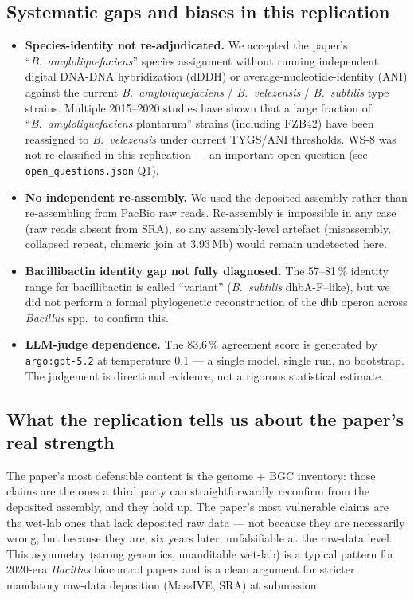 \documentclass[11pt]{article}
\begin{document}
\subsection{Systematic gaps and biases in this replication}
\begin{itemize}
\item \textbf{Species-identity not re-adjudicated.} We accepted the paper's ``\textit{B.\ amyloliquefaciens}'' species assignment without running independent digital DNA-DNA hybridization (dDDH) or average-nucleotide-identity (ANI) against the current \textit{B.\ amyloliquefaciens} / \textit{B.\ velezensis} / \textit{B.\ subtilis} type strains. Multiple 2015--2020 studies have shown that a large fraction of ``\textit{B.\ amyloliquefaciens} plantarum'' strains (including FZB42) have been reassigned to \textit{B.\ velezensis} under current TYGS/ANI thresholds. WS-8 was not re-classified in this replication --- an important open question (see \texttt{open\_questions.json} Q1).
\item \textbf{No independent re-assembly.} We used the deposited assembly rather than re-assembling from PacBio raw reads. Re-assembly is impossible in any case (raw reads absent from SRA), so any assembly-level artefact (misassembly, collapsed repeat, chimeric join at 3.93\,Mb) would remain undetected here.
\item \textbf{Bacillibactin identity gap not fully diagnosed.} The 57--81\,\% identity range for bacillibactin is called ``variant'' (\textit{B.\ subtilis} dhbA-F--like), but we did not perform a formal phylogenetic reconstruction of the \texttt{dhb} operon across \textit{Bacillus} spp.\ to confirm this.
\item \textbf{LLM-judge dependence.} The 83.6\,\% agreement score is generated by \texttt{argo:gpt-5.2} at temperature 0.1 --- a single model, single run, no bootstrap. The judgement is directional evidence, not a rigorous statistical estimate.
\end{itemize}

\subsection{What the replication tells us about the paper's real strength}
The paper's most defensible content is the genome + BGC inventory: those claims are the ones a third party can straightforwardly reconfirm from the deposited assembly, and they hold up. The paper's most vulnerable claims are the wet-lab ones that lack deposited raw data --- not because they are necessarily wrong, but because they are, six years later, unfalsifiable at the raw-data level. This asymmetry (strong genomics, unauditable wet-lab) is a typical pattern for 2020-era \textit{Bacillus} biocontrol papers and is a clean argument for stricter mandatory raw-data deposition (MassIVE, SRA) at submission.
\end{document}
